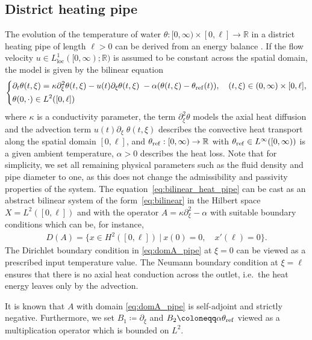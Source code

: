 \documentclass{cocv}
\newcommand{\RR}{\mathbb R}
\DeclareMathOperator{\loc}{loc}
\theoremstyle{definition}
\begin{document}
\subsection{District heating pipe}
The evolution of the temperature of water
$\theta:[0,\infty)\times[0,\ell]\to\RR$ in a district heating pipe of
length $\ell>0$ can be derived from an energy balance
\cite{vdHeFRSSBMN17}. If the flow velocity
$u\in L^1_{\loc}([0,\infty);\RR)$ is assumed to be constant across the
spatial domain, the model is given by the bilinear equation
\begin{align}
\label{eq:bilinear_heat_pipe}
\left\{
\begin{aligned}
&        \partial_t \theta(t,\xi) = \kappa\partial_\xi^2 \theta(t,\xi) - u(t) \partial_\xi \!\!\;\theta(t,\xi) \;-\alpha (\theta(t,\xi)-\theta_{\rm ref}(t)), \quad (t,\xi) \in (0, \infty) \times [0,\ell],\\ &\theta(0,\cdot)\in L^2([0,\ell])
\end{aligned}
\right.
\end{align}
where $\kappa$ is a conductivity parameter, the term $\partial_\xi^2 \theta$ models the axial heat diffusion and the advection term $u(t) \partial_\xi \!\!\;\theta(t,\xi)$ describes the convective heat transport along the spatial domain $[0,\ell]$, and  $\theta_{\rm ref}:[0,\infty)\rightarrow\RR$ with $\theta_{\rm ref}\in L^\infty([0,\infty))$ is a given ambient temperature, $\alpha>0$ describes the heat loss. Note that for simplicity, we set all remaining physical  parameters such as the fluid density and pipe diameter to one, as this does not change the admissibility and passivity properties of the system. The equation~\eqref{eq:bilinear_heat_pipe} can be cast as an abstract bilinear system of the form~\eqref{eq:bilinear} in the Hilbert space $X=L^2([0,\ell])$ and with the operator $A=\kappa\partial_\xi^2-\alpha$ with suitable boundary conditions which can be, for instance, 
\begin{align}
    \label{eq:domA_pipe}
D(A)=\{x\in H^2([0,\ell])~|~ x(0)=0,\quad x'(\ell)=0\}.
\end{align}
The Dirichlet boundary condition in \eqref{eq:domA_pipe} at $\xi=0$ can be viewed as a prescribed input temperature value. 
The Neumann boundary condition at $\xi=\ell$ ensures that there is no axial heat conduction across the outlet, i.e.\ the heat energy leaves only by the advection. 

It is known that $A$ with domain \eqref{eq:domA_pipe} is self-adjoint and strictly negative. Furthermore, we set $B_1 \coloneqq \partial_\xi$ and $B_2\coloneqq \alpha\theta_{\rm ref}$ viewed as a multiplication operator which is bounded on $L^2$.
\end{document}
